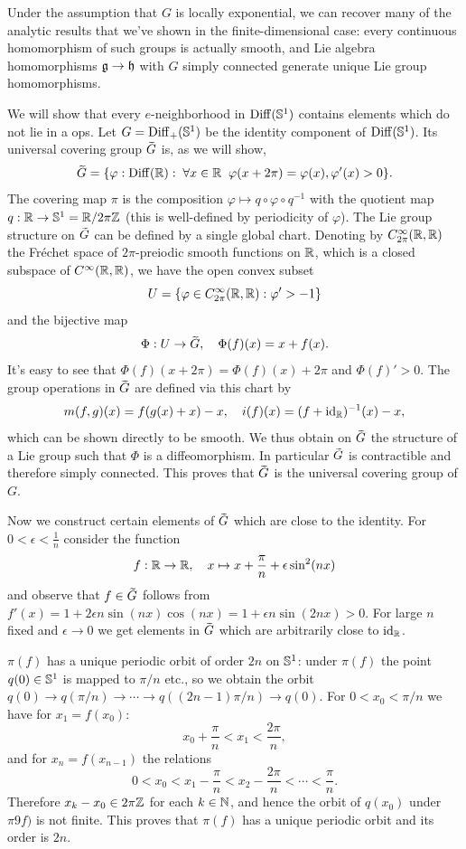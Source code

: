 Under the assumption that $G$ is locally exponential, we can recover many of the analytic results that we've shown in the finite-dimensional case: every continuous homomorphism of such groups is actually smooth, and Lie algebra homomorphisms $\mathfrak{g}\to \mathfrak{h}$ with $G$ simply connected generate unique Lie group homomorphisms.

\begin{example}
    We will show that every $e$-neighborhood in $\operatorname{Diff}(\mathbb{S}^1)$ contains elements which do not lie in a \gls{ops}. Let $G=\operatorname{Diff}_+(\mathbb{S}^1)$ be the identity component of $\operatorname{Diff}(\mathbb{S}^1)$. Its universal covering group $\wt{G}$ is, as we will show,
    \[\wt{G}=\{\varphi:\Diff(\bbR):\; \forall x\in\bbR\;\;\varphi(x+2\pi)=\varphi(x),\varphi'(x)>0\}.\]
    The covering map $\pi$ is the composition $\varphi\mapsto q\circ \varphi\circ q^{-1}$ with the quotient map $q:\mathbb{R}\to \mathbb{S}^1=\mathbb{R}\slash 2\pi\mathbb{Z}$ (this is well-defined by periodicity of $\varphi$). The Lie group structure on $\wt{G}$ can be defined by a single global chart. Denoting by $C^\infty_{2\pi}(\mathbb{R},\mathbb{R})$ the Fr\'echet space of $2\pi$-preiodic smooth functions on $\mathbb{R}$, which is a closed subspace of $C^\infty(\mathbb{R},\mathbb{R})$, we have the open convex subset 
    \[U=\{\varphi\in C^\infty_{2\pi}(\mathbb{R},\mathbb{R}):\varphi'>-1\}\]
    and the bijective map
    \[\Phi:U\to \wt{G},\quad \Phi(f)(x)=x+f(x).\]
    It's easy to see that $\Phi(f)(x+2\pi)=\Phi(f)(x)+2\pi$ and $\Phi(f)'>0$. The group operations in $\wt{G}$ are defined via this chart by
    \[m(f,g)(x)=f(g(x)+x)-x,\quad i(f)(x)=(f+\operatorname{id}_{\mathbb{R}})^{-1}(x)-x,\]
    which can be shown directly to be smooth. We thus obtain on $\wt{G}$ the structure of a Lie group such that $\Phi$ is a diffeomorphism. In particular $\wt{G}$ is contractible and therefore simply connected. This proves that $\wt{G}$ is the universal covering group of $G$.

    Now we construct certain elements of $\wt{G}$ which are close to the identity. For $0<\epsilon<\frac 1n$ consider the function
    \[f:\mathbb{R}\to\mathbb{R},\quad x\mapsto x+\frac{\pi}{n}+\epsilon \sin^2(nx)\]
    and observe that $f\in\wt{G}$ follows from $f'(x)=1+2\epsilon n\sin(nx)\cos(nx)=1+\epsilon n\sin(2nx)>0$. For large $n$ fixed and $\epsilon\to 0$ we get elements in $\wt{G}$ which are arbitrarily close to $\operatorname{id}_{\mathbb{R}}$.

    $\pi(f)$ has a unique periodic orbit of order $2n$ on $\mathbb{S}^1$: under $\pi(f)$ the point $q(0)\in\mathbb{S}^1$ is mapped to $\pi/n$ etc., so we obtain the orbit $q(0)\to q(\pi/n)\to \cdots\to q((2n-1)\pi/n)\to q(0)$. For $0<x_0<\pi/n$ we have for $x_1=f(x_0)$:
    \[x_0+\frac \pi n<x_1<\frac{2\pi}{n},\]
    and for $x_n=f(x_{n-1})$ the relations
    \[0<x_0<x_1-\frac\pi n<x_2-\frac{2\pi}{n}<\cdots <\frac\pi n.\]
    Therefore $x_k-x_0\in 2\pi\mathbb{Z}$ for each $k\in \mathbb{N}$, and hence the orbit of $q(x_0)$ under $\pi9f)$ is not finite. This proves that $\pi(f)$ has a unique periodic orbit and its order is $2n$.


\end{example}
